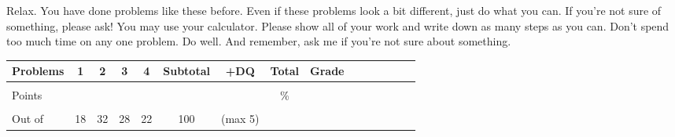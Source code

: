 \documentclass[12pt]{article}
\begin{document}
Relax.  You have done problems like these before.  Even if these problems look a bit different, just do what you can.  If you're not sure of something, please ask! You may use your calculator.  Please show all of your work and write down as many steps as you can.  Don't spend too much time on any one problem.  Do well.  And remember, ask me if you're not sure about something.
 
 \begin{center}

\begin{tabular}
{|l|c|c|c|c|c|c|c|c|c|c|c|c||c|c} \hline

 Problems & \hspace{5 pt} 1 \hspace{5 pt}  & \hspace{5 pt} 2 \hspace{5 pt} & \hspace{5 pt} 3 \hspace{5 pt} & \hspace{5 pt} 4 \hspace{5 pt} &  \hspace{5 pt} Subtotal  \hspace{5 pt} & +DQ& Total &\hspace{5 pt} Grade \hspace{5 pt}  \\ \hline
&&&&&&&&\\  
Points &&&&&&&   \hspace{.8in}\% &  \\ 
&&&&&&&& \\  \hline
Out of & 18 & 32 & 28 & 22 &100 & (max 5)& & \\ \hline
\end {tabular}

\end{center}

\vfill

\newpage %
\end{document}
